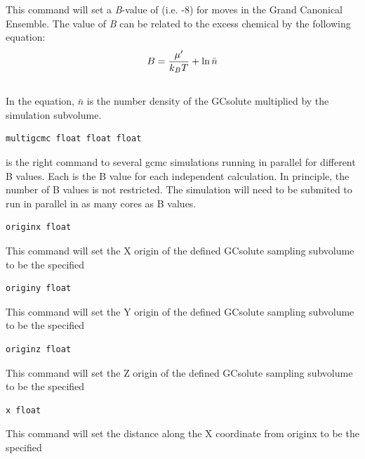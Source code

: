 \documentclass[letterpaper,10pt,english]{manual}
\begin{document}
This command will set a \emph{B}-value of  (i.e. -8) for moves in the Grand Canonical Ensemble. The value of \emph{B} can be related to the excess chemical by the following equation:
\hypertarget{equation-bval}{}\begin{gather}
\begin{split}B = \frac{\mu'}{k_{B}T}+\ln \bar{n}\end{split}\label{protoms-bval}\\\begin{split}\end{split}\notag
\end{gather}
In the equation, $\bar{n}$ is the number density of the GCsolute multiplied by the simulation subvolume.
\begin{Verbatim}[commandchars=@\[\]]
multigcmc float float float
\end{Verbatim}

is the right command to several gcmc simulations running in parallel for different B values. Each  is the B value for each independent calculation. In principle, the number of B values is not restricted. The simulation will need to be submited to run in parallel in as many cores as B values.
\begin{Verbatim}[commandchars=@\[\]]
originx float
\end{Verbatim}

This command will set the X origin of the defined GCsolute sampling subvolume to be the specified 

\begin{Verbatim}[commandchars=@\[\]]
originy float
\end{Verbatim}

This command will set the Y origin of the defined GCsolute sampling subvolume to be the specified 

\begin{Verbatim}[commandchars=@\[\]]
originz float
\end{Verbatim}

This command will set the Z origin of the defined GCsolute sampling subvolume to be the specified 

\begin{Verbatim}[commandchars=@\[\]]
x float
\end{Verbatim}

This command will set the distance along the X coordinate from originx to be the specified 
\end{document}
